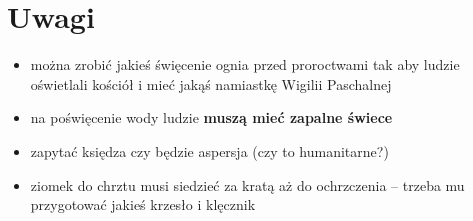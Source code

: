 \color{red}

\section{Uwagi}
\begin{itemize}
      \item można zrobić jakieś święcenie ognia przed proroctwami tak aby ludzie
            oświetlali kościół i mieć jakąś namiastkę Wigilii Paschalnej
      \item na poświęcenie wody ludzie \textbf{muszą mieć zapalne świece}
      \item zapytać księdza czy będzie aspersja (czy to humanitarne?)
      \item ziomek do chrztu musi siedzieć za kratą aż do ochrzczenia -- trzeba
            mu przygotować jakieś krzesło i klęcznik 
\end{itemize}